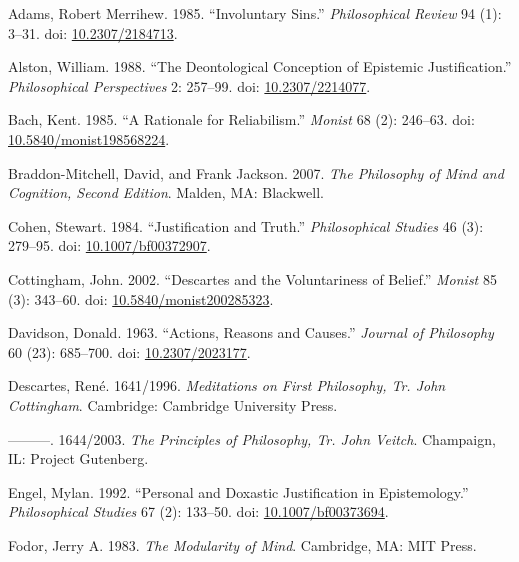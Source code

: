 \documentclass[
  11pt,
  letterpaper,
  DIV=11,
  numbers=noendperiod,
  twoside]{scrartcl}
\newlength{\cslhangindent}
\newenvironment{CSLReferences}[2] %
 {\begin{list}{}{%
  \setlength{\itemindent}{0pt}
  \setlength{\leftmargin}{0pt}
  \setlength{\parsep}{0pt}
  \ifodd #1
   \setlength{\leftmargin}{\cslhangindent}
   \setlength{\itemindent}{-1\cslhangindent}
  \fi
  \setlength{\itemsep}{#2\baselineskip}}}
 {\end{list}}
\begin{document}
\label{refs}
\begin{CSLReferences}{1}{0}
Adams, Robert Merrihew. 1985. {``Involuntary Sins.''}
\emph{Philosophical Review} 94 (1): 3--31. doi:
\href{https://doi.org/10.2307/2184713}{10.2307/2184713}.

Alston, William. 1988. {``The Deontological Conception of Epistemic
Justification.''} \emph{Philosophical Perspectives} 2: 257--99. doi:
\href{https://doi.org/10.2307/2214077}{10.2307/2214077}.

Bach, Kent. 1985. {``A Rationale for Reliabilism.''} \emph{Monist} 68
(2): 246--63. doi:
\href{https://doi.org/10.5840/monist198568224}{10.5840/monist198568224}.

Braddon-Mitchell, David, and Frank Jackson. 2007. \emph{The Philosophy
of Mind and Cognition, {Second Edition}}. Malden, MA: Blackwell.

Cohen, Stewart. 1984. {``Justification and Truth.''} \emph{Philosophical
Studies} 46 (3): 279--95. doi:
\href{https://doi.org/10.1007/bf00372907}{10.1007/bf00372907}.

Cottingham, John. 2002. {``Descartes and the Voluntariness of Belief.''}
\emph{Monist} 85 (3): 343--60. doi:
\href{https://doi.org/10.5840/monist200285323}{10.5840/monist200285323}.

Davidson, Donald. 1963. {``Actions, Reasons and Causes.''} \emph{Journal
of Philosophy} 60 (23): 685--700. doi:
\href{https://doi.org/10.2307/2023177}{10.2307/2023177}.

Descartes, René. 1641/1996. \emph{Meditations on First Philosophy, {Tr.
John Cottingham}}. Cambridge: Cambridge University Press.

---------. 1644/2003. \emph{The Principles of Philosophy, {Tr. John
Veitch}}. Champaign, IL: Project Gutenberg.

Engel, Mylan. 1992. {``Personal and Doxastic Justification in
Epistemology.''} \emph{Philosophical Studies} 67 (2): 133--50. doi:
\href{https://doi.org/10.1007/bf00373694}{10.1007/bf00373694}.

Fodor, Jerry A. 1983. \emph{The Modularity of Mind}. Cambridge, MA: MIT
Press.


\end{CSLReferences}
\end{document}
